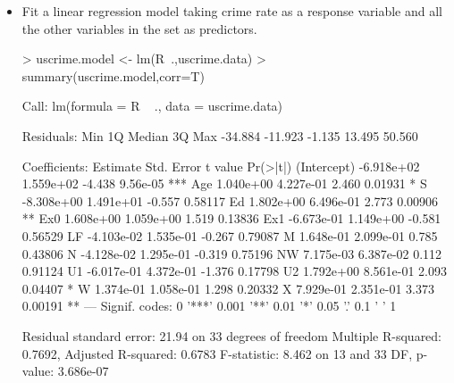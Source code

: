 \documentclass[a4paper]{article}
\begin{document}
\begin{itemize}
\item Fit a linear regression model taking crime rate as a response variable and
all the other variables in the set as predictors.
\begin{Schunk}
\begin{Sinput}
> uscrime.model <- lm(R~.,uscrime.data)
> summary(uscrime.model,corr=T)
\end{Sinput}
\begin{Soutput}
Call:
lm(formula = R ~ ., data = uscrime.data)

Residuals:
    Min      1Q  Median      3Q     Max 
-34.884 -11.923  -1.135  13.495  50.560 

Coefficients:
              Estimate Std. Error t value Pr(>|t|)    
(Intercept) -6.918e+02  1.559e+02  -4.438 9.56e-05 ***
Age          1.040e+00  4.227e-01   2.460  0.01931 *  
S           -8.308e+00  1.491e+01  -0.557  0.58117    
Ed           1.802e+00  6.496e-01   2.773  0.00906 ** 
Ex0          1.608e+00  1.059e+00   1.519  0.13836    
Ex1         -6.673e-01  1.149e+00  -0.581  0.56529    
LF          -4.103e-02  1.535e-01  -0.267  0.79087    
M            1.648e-01  2.099e-01   0.785  0.43806    
N           -4.128e-02  1.295e-01  -0.319  0.75196    
NW           7.175e-03  6.387e-02   0.112  0.91124    
U1          -6.017e-01  4.372e-01  -1.376  0.17798    
U2           1.792e+00  8.561e-01   2.093  0.04407 *  
W            1.374e-01  1.058e-01   1.298  0.20332    
X            7.929e-01  2.351e-01   3.373  0.00191 ** 
---
Signif. codes:  0 '***' 0.001 '**' 0.01 '*' 0.05 '.' 0.1 ' ' 1

Residual standard error: 21.94 on 33 degrees of freedom
Multiple R-squared:  0.7692,	Adjusted R-squared:  0.6783 
F-statistic: 8.462 on 13 and 33 DF,  p-value: 3.686e-07


\end{Soutput}
\end{Schunk}
\end{itemize}
\end{document}
